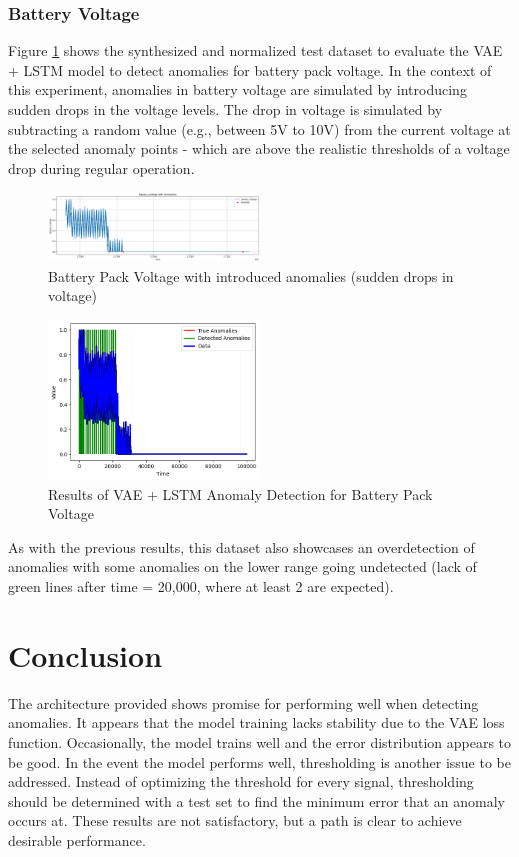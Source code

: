 \documentclass[conference]{IEEEtran}
\begin{document}
\subsubsection{Battery Voltage}
Figure \ref{aj_fig__5} shows the synthesized and normalized test dataset to evaluate the VAE + LSTM model to detect anomalies for battery pack voltage. In the context of this experiment, anomalies in battery voltage are simulated by introducing sudden drops in the voltage levels. The drop in voltage is simulated by subtracting a random value (e.g., between 5V to 10V) from the current voltage at the selected anomaly points - which are above the realistic thresholds of a voltage drop during regular operation.

\begin{figure}[htbp]
    \centering
    \includegraphics[width=0.5\textwidth]{aj_fig_5.png}
    \caption{Battery Pack Voltage with introduced anomalies (sudden drops in voltage)}
    \label{aj_fig__5}
\end{figure}

\begin{figure}[htbp]
    \centering
    \includegraphics[width=0.5\textwidth]{aj_fig_6.png}
    \caption{Results of VAE + LSTM Anomaly Detection for Battery Pack Voltage}
    \label{aj_fig__6}
\end{figure}

As with the previous results, this dataset also showcases an overdetection of anomalies with some anomalies on the lower range going undetected (lack of green lines after time = 20,000, where at least 2 are expected). 

\section{Conclusion}
The architecture provided shows promise for performing well when detecting anomalies. It appears that the model training lacks stability due to the VAE loss function. Occasionally, the model trains well and the error distribution appears to be good. In the event the model performs well, thresholding is another issue to be addressed. Instead of optimizing the threshold for every signal, thresholding should be determined with a test set to find the minimum error that an anomaly occurs at. These results are not satisfactory, but a path is clear to achieve desirable performance.
\end{document}
